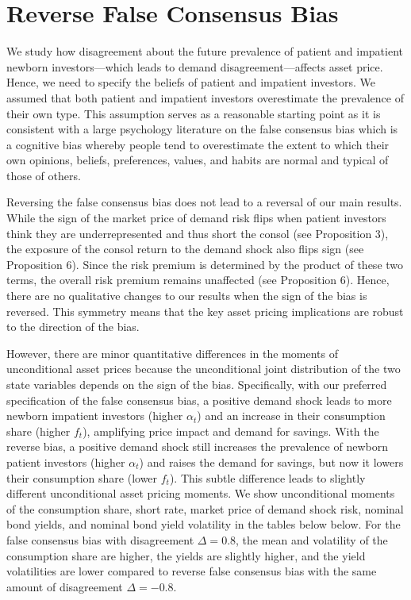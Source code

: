 \section{Reverse False Consensus Bias}\label{IArevbias}

We study how disagreement about the future prevalence of patient and impatient newborn investors---which leads to demand disagreement---affects asset price. Hence, we need to specify the beliefs of patient and impatient investors. We assumed that both patient and impatient investors overestimate the prevalence of their own type. This assumption serves as a reasonable starting point as it is consistent with a large psychology literature on the false consensus bias which is a cognitive bias whereby people tend to overestimate the extent to which their own opinions, beliefs, preferences, values, and habits are normal and typical of those of others.  %

Reversing the false consensus bias does not lead to a reversal of our main results. While the sign of the market price of demand risk flips when patient investors think they are underrepresented and thus short the consol (see Proposition 3), the exposure of the consol return to the demand shock also flips sign (see Proposition 6). Since the risk premium is determined by the product of these two terms, the overall risk premium remains unaffected (see Proposition 6). Hence, there are no qualitative changes to our results when the sign of the bias is reversed. This symmetry means that the key asset pricing implications are robust to the direction of the bias. 

However, there are minor quantitative differences in the moments of unconditional asset prices because the unconditional joint distribution of the two state variables depends on the sign of the bias. Specifically, with our preferred specification of the false consensus bias, a positive demand shock leads to more newborn impatient investors (higher $\alpha_t$) and an increase in their consumption share (higher $f_t$), amplifying price impact and demand for savings. With the reverse bias, a positive demand shock still increases the prevalence of newborn patient investors (higher $\alpha_t$) and raises the demand for savings, but now it lowers their consumption share (lower $f_t$). This subtle difference leads to slightly different unconditional asset pricing moments. We show unconditional moments of the consumption share, short rate, market price of demand shock risk, nominal bond yields, and nominal bond yield volatility in the tables below below.  For the false consensus bias with disagreement $\Delta = 0.8$, the mean and volatility of the consumption share are higher, the yields are slightly higher, and the yield volatilities are lower compared to reverse false consensus bias with the same amount of disagreement $\Delta = -0.8$.  




